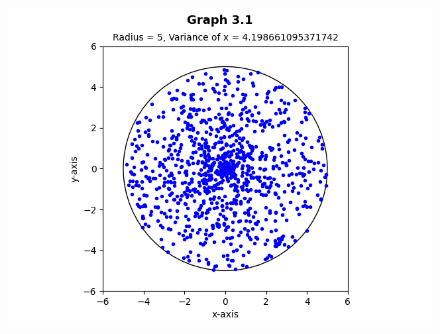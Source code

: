 \documentclass[answers]{exam}
\begin{document}
\begin{figure}[h]
  \centering
  \includegraphics[scale=0.7]{Q3/Q3(1).png}
\end{figure}
\newpage
\end{document}
